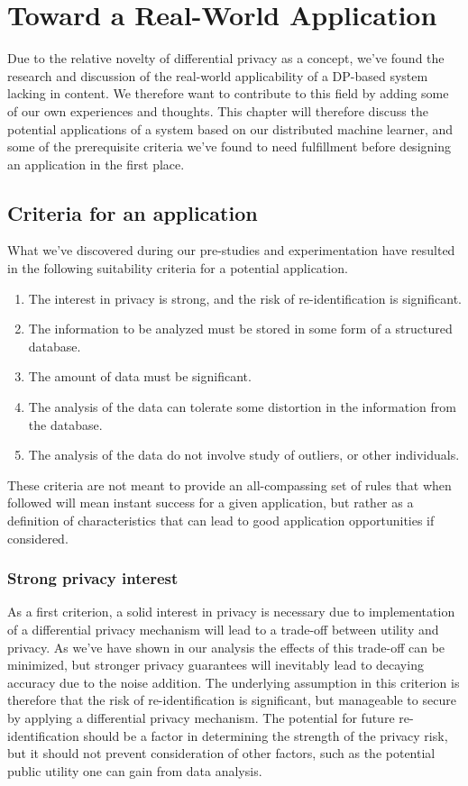 \chapter{Toward a Real-World Application}
Due to the relative novelty of differential privacy as a concept, we've found the research and discussion of the real-world applicability of a DP-based system lacking in content. We therefore want to contribute to this field by adding some of our own experiences and thoughts.  This chapter will therefore discuss the potential applications of a system based on our distributed machine learner, and some of the prerequisite criteria we've found to need fulfillment before designing an application in the first place.   

\section{Criteria for an application} \label{sec:suitability_criteria}
What we've discovered during our pre-studies and experimentation have resulted in the following suitability criteria for a potential application. 
\begin{enumerate}
	\item The interest in privacy is strong, and the risk of re-identification is significant.
	\item The information to be analyzed must be stored in some form of a structured database.
	\item The amount of data must be significant.
	\item The analysis of the data can tolerate some distortion in the information from the database.
	\item The analysis of the data do not involve study of outliers, or other individuals.
\end{enumerate}
These criteria are not meant to provide an all-compassing set of rules that when followed will mean instant success for a given application, but rather as a definition of characteristics that can lead to good application opportunities if considered.  

\subsection{Strong privacy interest}
As a first criterion, a solid interest in privacy is necessary due to implementation of a differential privacy mechanism will lead to a trade-off between utility and privacy. As we've have shown in our analysis the effects of this trade-off can be minimized, but stronger privacy guarantees will inevitably lead to decaying accuracy due to the noise addition. The underlying assumption in this criterion is therefore that the risk of re-identification is significant, but manageable to secure by applying a differential privacy mechanism. The potential for future re-identification should be a factor in determining the strength of the privacy risk, but it should not prevent consideration of other factors, such as the potential public utility one can gain from data analysis.

